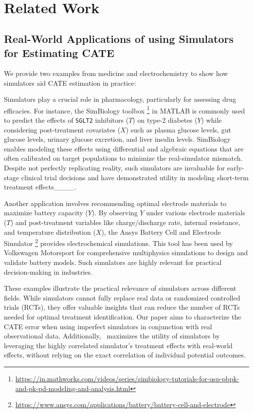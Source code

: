 \section{Related Work}


\subsection{Real-World Applications of using Simulators for Estimating CATE}
\label{app:sim_examples}
We provide two examples from medicine and electrochemistry to show how simulators aid CATE estimation in practice:

 Simulators play a crucial role in pharmacology, particularly for assessing drug efficacies. For instance, the SimBiology toolbox 
\footnote{\tiny{\url{https://in.mathworks.com/videos/series/simbiology-tutorials-for-qsp-pbpk-and-pk-pd-modeling-and-analysis.html}}} in MATLAB is commonly used to predict the effects of \verb|SGLT2| inhibitors ($T$) on type-2 diabetes ($Y$) while considering post-treatment covariates ($X$) such as plasma glucose levels, gut glucose levels, urinary glucose excretion, and liver insulin levels. SimBiology enables modeling these effects using differential and algebraic equations that are often calibrated on target populations to minimize the real-simulator mismatch. Despite not perfectly replicating reality, such simulators are invaluable for early-stage clinical trial decisions and have demonstrated utility in modeling short-term treatment effects____.


 Another application involves recommending optimal electrode materials to maximize battery capacity ($Y$). By observing $Y$ under various electrode materials ($T$) and post-treatment variables like charge/discharge rate, internal resistance, and temperature distribution ($X$), the Ansys Battery Cell and Electrode Simulator \footnote{\tiny{\url{https://www.ansys.com/applications/battery/battery-cell-and-electrode}}} provides electrochemical simulations. This tool has been used by Volkswagen Motorsport for comprehensive multiphysics simulations to design and validate battery models. Such simulators are highly relevant for practical decision-making in industries.

These examples illustrate the practical relevance of simulators across different fields. While simulators cannot fully replace real data or randomized controlled trials (RCTs), they offer valuable insights that can reduce the number of RCTs needed for optimal treatment identification. Our paper aims to characterize the CATE error when using imperfect simulators in conjunction with real observational data. Additionally, \our\ maximizes the utility of simulators by leveraging the highly correlated simulator's treatment effects with real-world effects, without relying on the exact correlation of individual potential outcomes.





